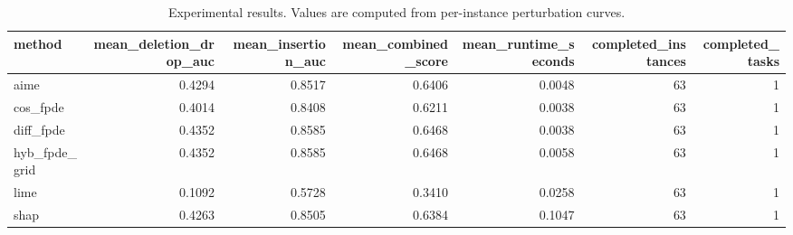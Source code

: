 \begin{table}[t]
\caption{Experimental results. Values are computed from per-instance perturbation curves.}
\label{tab:main_results_computed}
\centering
\begin{tabular}{lrrrrrr}
\toprule
method & mean\_deletion\_drop\_auc & mean\_insertion\_auc & mean\_combined\_score & mean\_runtime\_seconds & completed\_instances & completed\_tasks \\
\midrule
aime & 0.4294 & 0.8517 & 0.6406 & 0.0048 & 63 & 1 \\
cos\_fpde & 0.4014 & 0.8408 & 0.6211 & 0.0038 & 63 & 1 \\
diff\_fpde & 0.4352 & 0.8585 & 0.6468 & 0.0038 & 63 & 1 \\
hyb\_fpde\_grid & 0.4352 & 0.8585 & 0.6468 & 0.0058 & 63 & 1 \\
lime & 0.1092 & 0.5728 & 0.3410 & 0.0258 & 63 & 1 \\
shap & 0.4263 & 0.8505 & 0.6384 & 0.1047 & 63 & 1 \\
\bottomrule
\end{tabular}

\end{table}
